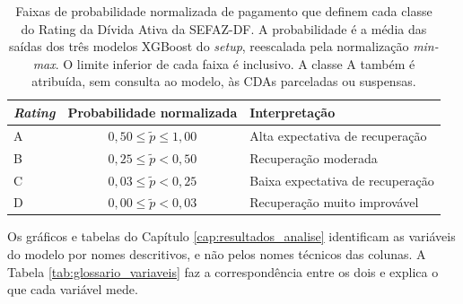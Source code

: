\begin{table}[H]
    \centering
    \caption[Faixas de probabilidade que definem cada classe de \textit{rating}]{Faixas de probabilidade normalizada de pagamento que definem cada classe do Rating da Dívida Ativa da SEFAZ-DF. A probabilidade é a média das saídas dos três modelos XGBoost do \textit{setup}, reescalada pela normalização \textit{min-max}. O limite inferior de cada faixa é inclusivo. A classe A também é atribuída, sem consulta ao modelo, às CDAs parceladas ou suspensas.}
    \label{tab:faixas_rating}
    \small
    \renewcommand{\arraystretch}{1.2}
    \begin{tabularx}{\textwidth}{>{\centering\arraybackslash}p{2.2cm}CL}
        \toprule
        \textbf{\textit{Rating}} & \textbf{Probabilidade normalizada} & \textbf{Interpretação} \\
        \midrule
        A & $0{,}50 \le \tilde{p} \le 1{,}00$ & Alta expectativa de recuperação \\
        B & $0{,}25 \le \tilde{p} < 0{,}50$ & Recuperação moderada \\
        C & $0{,}03 \le \tilde{p} < 0{,}25$ & Baixa expectativa de recuperação \\
        D & $0{,}00 \le \tilde{p} < 0{,}03$ & Recuperação muito improvável \\
        \bottomrule
    \end{tabularx}
\end{table}

Os gráficos e tabelas do Capítulo \ref{cap:resultados_analise} identificam as variáveis do modelo por nomes descritivos, e não pelos nomes técnicos das colunas. A Tabela \ref{tab:glossario_variaveis} faz a correspondência entre os dois e explica o que cada variável mede.

